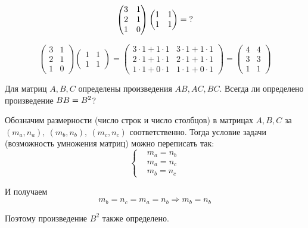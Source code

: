 \documentclass[a4paper,12pt]{article}
\begin{document}
  \begin{problem}[15.5(7)]
    \[
      \begin{pmatrix}
        3 & 1\\
        2 & 1\\
        1 & 0
      \end{pmatrix}
      \begin{pmatrix}
        1 & 1\\
        1 & 1
      \end{pmatrix}= \operatorname{?}
    \]
  \end{problem}
  
  \begin{solution}
    \[
      \begin{pmatrix}
        3 & 1\\
        2 & 1\\
        1 & 0
      \end{pmatrix}
      \begin{pmatrix}
        1 & 1\\
        1 & 1
      \end{pmatrix}
      = \begin{pmatrix}
        3 \cdot 1 + 1 \cdot 1 & 3 \cdot 1 + 1 \cdot 1\\
        2 \cdot 1 + 1 \cdot 1 & 2 \cdot 1 + 1 \cdot 1\\
        1 \cdot 1 + 0 \cdot 1 & 1 \cdot 1 + 0 \cdot 1
      \end{pmatrix}
      = \begin{pmatrix}
        4 & 4\\
        3 & 3\\
        1 & 1
      \end{pmatrix}
    \]
  \end{solution}
  
  \begin{problem}[Т1$^*$]
    Для матриц $A, B, C$ определены произведения $AB, AC, BC$.
    Всегда ли определено произведение $BB \hm= B^2$?
  \end{problem}
  
  \begin{solution}
    Обозначим размерности (число строк и число столбцов) в матрицах $A, B, C$ за
    $(m_a, n_a),\ (m_b, n_b),\ (m_c, n_c)$ соответственно.
    Тогда условие задачи (возможность умножения матриц) можно переписать так:
    \[
      \left\{
        \begin{aligned}
          &m_a = n_b\\
          &m_a = n_c\\
          &m_b = n_c
        \end{aligned}
      \right.
    \]
    
    И получаем
    \[
      m_b = n_c = m_a = n_b \Rightarrow m_b = n_b
    \]
    
    Поэтому произведение $B^2$ также определено.
  \end{solution}
  
\end{document}
